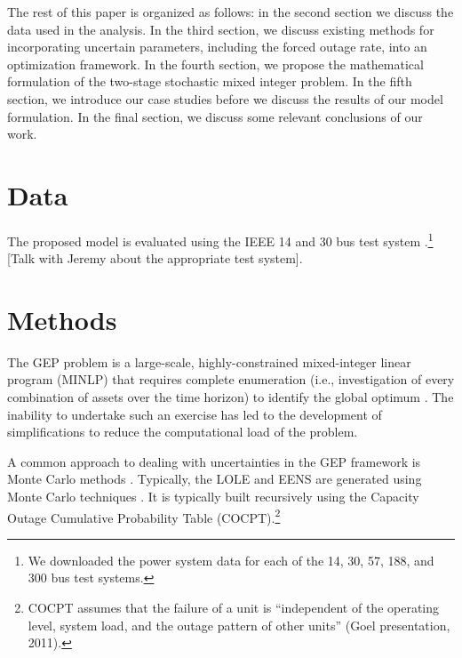 \documentclass[10pt]{amsart}
\begin{document}
The rest of this paper is organized as follows: in the second section we discuss the data used in the analysis. 
In the third section, we discuss existing methods for incorporating uncertain parameters, including the forced outage rate, into an optimization framework.
In the fourth section, we propose the mathematical formulation of the two-stage stochastic mixed integer problem. 
In the fifth section, we introduce our case studies before we discuss the results of our model formulation.
In the final section, we discuss some relevant conclusions of our work. 

\section{Data}
The proposed model is evaluated using the IEEE 14 and 30 bus test system \parencite{christie:2009aa}.\footnote{We downloaded the power system data for each of the 14, 30, 57, 188, and 300 bus test systems.}  
[Talk with Jeremy about the appropriate test system].


\section{Methods}
The GEP problem is a large-scale, highly-constrained mixed-integer linear program (MINLP) that requires complete enumeration (i.e., investigation of every combination of assets over the time horizon) to identify the global optimum \parencite{bakirtzis:2012aa}.  
The inability to undertake such an exercise has led to the development of simplifications to reduce the computational load of the problem. 

A common approach to dealing with uncertainties in the GEP framework is Monte Carlo methods \parencite{pereira2010decision}.
Typically, the LOLE and EENS are generated using Monte Carlo techniques \parencite{billinton1996reliability, li2012uncertainty}. 
It is typically built recursively using the Capacity Outage Cumulative Probability Table (COCPT).\footnote{COCPT assumes that the failure of a unit is ``independent of the operating level, system load, and the outage pattern of other units'' (Goel presentation, 2011).} 
\end{document}
